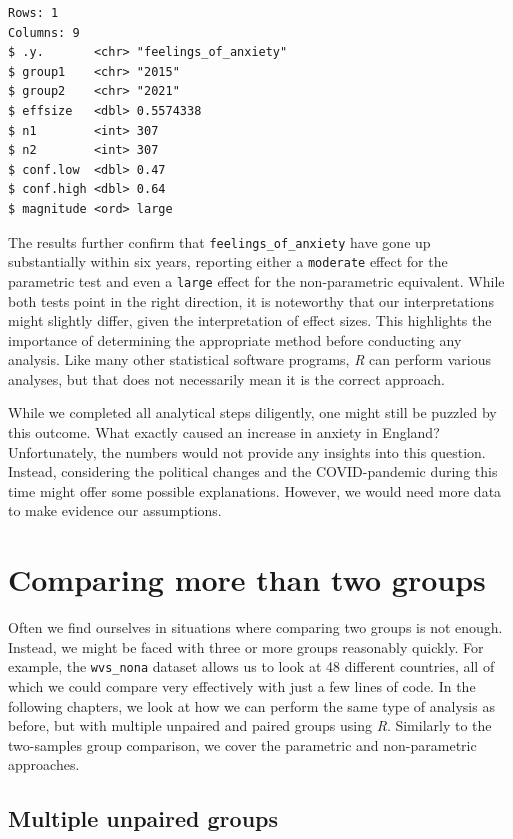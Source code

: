 \documentclass[
  letterpaper,
]{krantz}
\begin{document}
\begin{verbatim}
Rows: 1
Columns: 9
$ .y.       <chr> "feelings_of_anxiety"
$ group1    <chr> "2015"
$ group2    <chr> "2021"
$ effsize   <dbl> 0.5574338
$ n1        <int> 307
$ n2        <int> 307
$ conf.low  <dbl> 0.47
$ conf.high <dbl> 0.64
$ magnitude <ord> large
\end{verbatim}

The results further confirm that \texttt{feelings\_of\_anxiety} have
gone up substantially within six years, reporting either a
\texttt{moderate} effect for the parametric test and even a
\texttt{large} effect for the non-parametric equivalent. While both
tests point in the right direction, it is noteworthy that our
interpretations might slightly differ, given the interpretation of
effect sizes. This highlights the importance of determining the
appropriate method before conducting any analysis. Like many other
statistical software programs, \emph{R} can perform various analyses,
but that does not necessarily mean it is the correct approach.

While we completed all analytical steps diligently, one might still be
puzzled by this outcome. What exactly caused an increase in anxiety in
England? Unfortunately, the numbers would not provide any insights into
this question. Instead, considering the political changes and the
COVID-pandemic during this time might offer some possible explanations.
However, we would need more data to make evidence our assumptions.

\section{Comparing more than two
groups}\label{sec-comparing-more-than-two-groups}

Often we find ourselves in situations where comparing two groups is not
enough. Instead, we might be faced with three or more groups reasonably
quickly. For example, the \texttt{wvs\_nona} dataset allows us to look
at 48 different countries, all of which we could compare very
effectively with just a few lines of code. In the following chapters, we
look at how we can perform the same type of analysis as before, but with
multiple unpaired and paired groups using \emph{R}. Similarly to the
two-samples group comparison, we cover the parametric and non-parametric
approaches.

\subsection{Multiple unpaired
groups}\label{sec-multiple-unpaired-groups}
\end{document}
